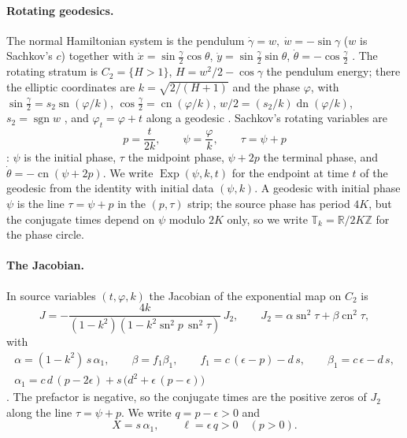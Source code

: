 \documentclass[11pt]{article}
\theoremstyle{remark}
\newcommand{\sn}{\operatorname{sn}}
\newcommand{\cn}{\operatorname{cn}}
\newcommand{\dn}{\operatorname{dn}}
\newcommand{\Torus}{\mathbb T}
\begin{document}
\paragraph{Rotating geodesics.}
The normal Hamiltonian system is the pendulum
$\dot\gamma=w,\ \dot w=-\sin\gamma$ ($w$ is Sachkov's $c$) together with
$\dot x=\sin\tfrac\gamma2\cos\theta$, $\dot y=\sin\tfrac\gamma2\sin\theta$,
$\dot\theta=-\cos\tfrac\gamma2$ \cite[eqs.~(1.6)--(1.9)]{Sachkov2010Conjugate}.
The rotating stratum is $C_2=\{H>1\}$, $H=w^2/2-\cos\gamma$ the pendulum
energy; there the elliptic coordinates are $k=\sqrt{2/(H+1)}$ and the phase
$\varphi$, with
$\sin\tfrac\gamma2=s_2\sn(\varphi/k)$, $\cos\tfrac\gamma2=\cn(\varphi/k)$,
$w/2=(s_2/k)\dn(\varphi/k)$, $s_2=\operatorname{sgn}w$ \cite[\S3.2]{MoiseevSachkov2010Maxwell}, and
$\varphi_t=\varphi+t$ along a geodesic \cite[\S3.3]{MoiseevSachkov2010Maxwell}.  Sachkov's rotating variables are
\begin{equation}\label{eq:coordinates}
 p=\frac{t}{2k},\qquad \psi=\frac{\varphi}{k},\qquad \tau=\psi+p
\end{equation}
\cite[eq.~(2.10)]{Sachkov2010Conjugate}: $\psi$ is the initial phase, $\tau$
the midpoint phase, $\psi+2p$ the terminal phase, and
$\dot\theta=-\cn(\psi+2p)$.  We write $\operatorname{Exp}(\psi,k,t)$ for
the endpoint at time $t$ of the geodesic from the identity with initial
data $(\psi,k)$.  A
geodesic with initial phase $\psi$ is the
line $\tau=\psi+p$ in the $(p,\tau)$ strip; the source phase has period $4K$,
but the conjugate times depend on $\psi$ modulo $2K$ only, so we write
$\Torus_k=\mathbb R/2K\mathbb Z$ for the phase circle.

\paragraph{The Jacobian.}
In source variables $(t,\varphi,k)$ the Jacobian of the exponential map on
$C_2$ is
\begin{equation}\label{eq:full-jacobian}
 J=-\frac{4k}{(1-k^2)(1-k^2\sn^2p\,\sn^2\tau)}\,J_2,\qquad
 J_2=\alpha\sn^2\tau+\beta\cn^2\tau,
\end{equation}
with
\begin{equation}\label{eq:coefficients}
 \begin{gathered}
 \alpha=(1-k^2)\,s\,\alpha_1,\qquad \beta=f_1\beta_1,\qquad
 f_1=c\,(\epsilon-p)-d\,s,\qquad \beta_1=c\,\epsilon-d\,s,\\
 \alpha_1=c\,d\,(p-2\epsilon)+s\,\bigl(d^2+\epsilon\,(p-\epsilon)\bigr)
 \end{gathered}
\end{equation}
\cite[\S2.3, eqs.~(2.10)--(2.14)]{Sachkov2010Conjugate}.  The prefactor is
negative, so the conjugate times are the positive zeros of $J_2$ along the
line $\tau=\psi+p$.  We write $q=p-\epsilon>0$ \cite[Lemma~5.1]{MoiseevSachkov2010Maxwell}
and
\begin{equation}\label{eq:X-ell}
 X=s\,\alpha_1,\qquad \ell=\epsilon\,q>0\quad(p>0).
\end{equation}
\end{document}
